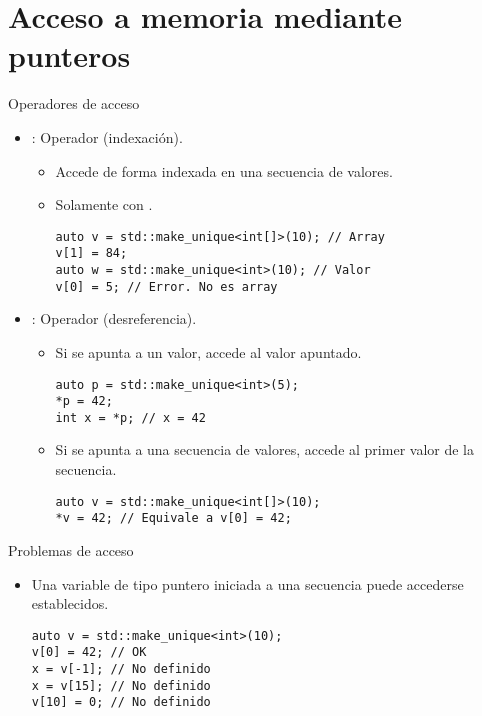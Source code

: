 \section{Acceso a memoria mediante punteros}

\begin{frame}[t,fragile]{Operadores de acceso}
\begin{itemize}
  \item {}: Operador \cppkey{[]} (indexación).
    \begin{itemize}
      \item Accede de forma indexada en una secuencia de valores.
      \item Solamente con .
\begin{lstlisting}
auto v = std::make_unique<int[]>(10); // Array
v[1] = 84;
auto w = std::make_unique<int>(10); // Valor
v[0] = 5; // Error. No es array
\end{lstlisting}
    \end{itemize}

  \item {}: Operador \cppkey{*} (desreferencia).
    \begin{itemize}
      \item Si se apunta a un valor, accede al valor apuntado.
\begin{lstlisting}
auto p = std::make_unique<int>(5);
*p = 42;
int x = *p; // x = 42
\end{lstlisting}

      \item Si se apunta a una secuencia de valores, accede al primer valor de la secuencia.
\begin{lstlisting}
auto v = std::make_unique<int[]>(10);
*v = 42; // Equivale a v[0] = 42;
\end{lstlisting}
    \end{itemize}
\end{itemize}
\end{frame}

\begin{frame}[t,fragile]{Problemas de acceso}
\begin{itemize}
  \item Una variable de tipo puntero iniciada a una secuencia 
         puede accederse 
         establecidos.
\begin{lstlisting}
auto v = std::make_unique<int>(10);
v[0] = 42; // OK
x = v[-1]; // No definido
x = v[15]; // No definido
v[10] = 0; // No definido
\end{lstlisting}
\end{itemize}
\end{frame}


